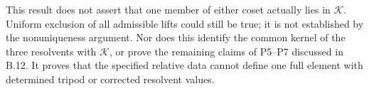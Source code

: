 This result does not assert
that one member of either
coset actually lies in
$\mathcal K$.  Uniform
exclusion of all admissible
lifts could still be true;
it is not established by
the nonuniqueness argument.
Nor does this identify the
common kernel of the three
resolvents with $\mathcal K$,
or prove the remaining
claims of P5--P7 discussed
in B.12.  It proves that
the specified relative data
cannot define one full
element with determined
tripod or corrected resolvent
values.
